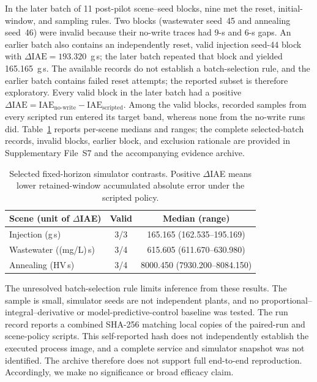 \documentclass[journal]{IEEEtran}
\begin{document}
In the later batch of 11 post-pilot scene--seed blocks, nine met the reset, initial-window, and sampling rules. Two blocks (wastewater seed~45 and annealing seed~46) were invalid because their no-write traces had 9-s and 6-s gaps. An earlier batch also contains an independently reset, valid injection seed-44 block with $\Delta\mathrm{IAE}=193.320$~g\,s; the later batch repeated that block and yielded 165.165~g\,s. The available records do not establish a batch-selection rule, and the earlier batch contains failed reset attempts; the reported subset is therefore exploratory. Every valid block in the later batch had a positive $\Delta\mathrm{IAE}=\mathrm{IAE}_{\mathrm{no\text{-}write}}-\mathrm{IAE}_{\mathrm{scripted}}$. Among the valid blocks, recorded samples from every scripted run entered its target band, whereas none from the no-write runs did. Table~\ref{tab:selected-iae} reports per-scene medians and ranges; the complete selected-batch records, invalid blocks, earlier block, and exclusion rationale are provided in Supplementary File~S7 and the accompanying evidence archive.

\begin{table}[!t]
\centering
\caption{Selected fixed-horizon simulator contrasts. Positive $\Delta$IAE means lower retained-window accumulated absolute error under the scripted policy.}
\label{tab:selected-iae}
\footnotesize
\setlength{\tabcolsep}{3pt}
\begin{tabular}{@{}lcc@{}}
\toprule
Scene (unit of $\Delta$IAE) & Valid & Median (range) \\
\midrule
Injection (g\,s) & 3/3 & 165.165 (162.535--195.169) \\
Wastewater ((mg/L)\,s) & 3/4 & 615.605 (611.670--630.980) \\
Annealing (HV\,s) & 3/4 & 8000.450 (7930.200--8084.150) \\
\bottomrule
\end{tabular}
\end{table}

The unresolved batch-selection rule limits inference from these results. The sample is small, simulator seeds are not independent plants, and no proportional--integral--derivative or model-predictive-control baseline was tested. The run record reports a combined SHA-256 matching local copies of the paired-run and scene-policy scripts. This self-reported hash does not independently establish the executed process image, and a complete service and simulator snapshot was not identified. The archive therefore does not support full end-to-end reproduction. Accordingly, we make no significance or broad efficacy claim.
\end{document}
